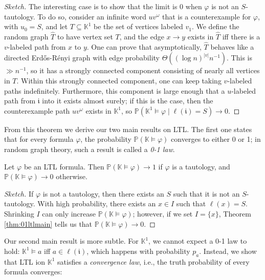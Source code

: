 \documentclass[runngingheads]{llncs}
\newcommand{\ini}{\mathfrak{i}}
\begin{document}
\begin{proof}[Sketch]
The interesting case is to show that the limit is $0$ when $\varphi$ is not an $S$-tautology. To do so, consider an infinite word $uv^{\omega}$ that is a counterexample for $\varphi$, with $u_0 = S$, and let $T \subseteq \mathbb{K}^1$ be the set of vertices labeled $v_1$. We define the random graph $\hat{T}$ to have vertex set $T$, and the edge $x \rightarrow y$ exists in $\hat{T}$ iff there is a $v$-labeled path from $x$ to $y$. One can prove that asymptotically, $\hat{T}$ behaves like a directed Erd\H{o}s-Rényi graph with edge probability $\Theta((\log n)^{|v|}n^{-1})$. This is $\gg n^{-1}$, so it has a strongly connected component consisting of nearly all vertices in $T$. Within this strongly connected component, one can keep taking $v$-labeled paths indefinitely. Furthermore, this component is large enough that a $u$-labeled path from $\ini$ into it exists almost surely; if this is the case, then the counterexample path $uv^{\omega}$ exists in $\mathbb{K}^1$, so $\mathbb{P}(\mathbb{K}^1 \models \varphi \mid \ell(\ini) = S) \rightarrow 0$.
\end{proof}

From this theorem we derive our two main results on LTL. The first one states that for every formula $\varphi$, the probability $\mathbb{P}(\mathbb{K}\models \varphi)$ converges to either 0 or 1; in random graph theory, such a result is called a \emph{0-1 law}.

\begin{theorem} \label{thm:01ltl}
Let $\varphi$ be an LTL formula. Then $\mathbb{P}(\mathbb{K} \models \varphi) \rightarrow 1$ if $\varphi$ is a tautology, and $\mathbb{P}(\mathbb{K} \models \varphi) \rightarrow 0$ otherwise.
\end{theorem}

\begin{proof}[Sketch]
If $\varphi$ is not a tautology, then there exists an $S$ such that it is not an $S$-tautology. With high probability, there exists an $x \in I$ such that $\ell(x) = S$. Shrinking $I$  can only increase $\mathbb{P}(\mathbb{K} \models \varphi)$; however, if we set $I = \{x\}$, Theorem \ref{thm:01ltlmain} tells us that $\mathbb{P}(\mathbb{K} \models \varphi) \rightarrow 0$.
\end{proof}

Our second main result is more subtle. For $\mathbb{K}^1$, we cannot expect a 0-1 law to hold: $\mathbb{K}^1 \models a$ iff $a \in \ell(\ini)$, which happens with probability $p_a$. Instead, we show that LTL ion $\mathbb{K}^1$ satisfies a \emph{convergence law}, i.e., the truth probability of every formula converges:
\end{document}
